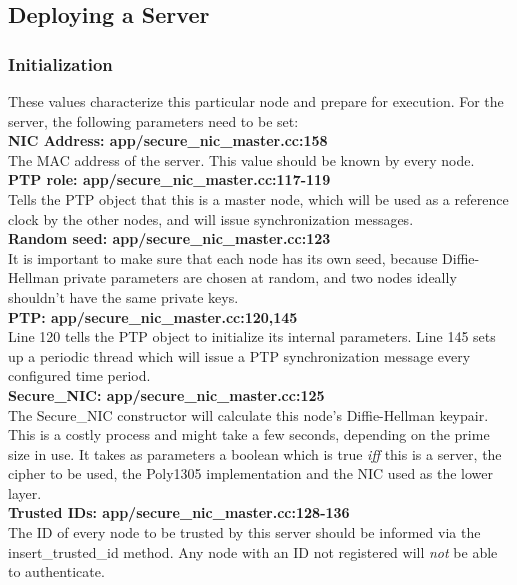 \documentclass[a4paper,10pt]{article}   %
\begin{document}
	\subsection{Deploying a Server}
	\subsubsection{Initialization}
		These values characterize this particular node and prepare for execution. For the server, the following parameters need to be set:\\

		\textbf{NIC Address: app/secure\_nic\_master.cc:158} \\
		\indent The MAC address of the server. This value should be known by every node.\\

		\textbf{PTP role: app/secure\_nic\_master.cc:117-119} \\
		\indent Tells the PTP object that this is a master node, which will be used as a reference clock by the other nodes, and will issue synchronization messages.\\


		\textbf{Random seed: app/secure\_nic\_master.cc:123} \\
		\indent It is important to make sure that each node has its own seed, because Diffie-Hellman private parameters are chosen at random, and two nodes ideally shouldn't have the same private keys.\\

		\textbf{PTP: app/secure\_nic\_master.cc:120,145} \\
		\indent Line 120 tells the PTP object to initialize its internal parameters. Line 145 sets up a periodic thread which will issue a PTP synchronization message every configured time period.\\

		\textbf{Secure\_NIC: app/secure\_nic\_master.cc:125} \\
		\indent The Secure\_NIC constructor will calculate this node's Diffie-Hellman keypair. This is a costly process and might take a few seconds, depending on the prime size in use. It takes as parameters a boolean which is true \textit{iff} this is a server, the cipher to be used, the Poly1305 implementation and the NIC used as the lower layer.\\

		\textbf{Trusted IDs: app/secure\_nic\_master.cc:128-136}\\
		\indent The ID of every node to be trusted by this server should be informed via the insert\_trusted\_id method. Any node with an ID not registered will \emph{not} be able to authenticate.\\
\end{document}
